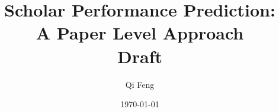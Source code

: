 \title{Scholar Performance Prediction:\\ A Paper Level Approach\\Draft}
\author{
Qi Feng
}
\date{\today}

\maketitle
